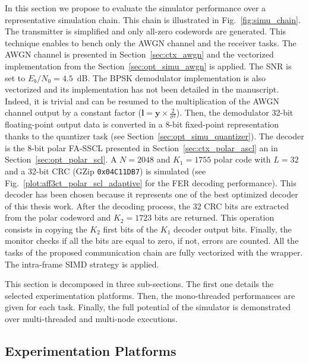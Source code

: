 In this section we propose to evaluate the simulator performance over a
representative simulation chain. This chain is illustrated in
Fig.~\ref{fig:simu_chain}. The transmitter is simplified and only all-zero
codewords are generated. This technique enables to bench only the AWGN channel
and the receiver tasks. The AWGN channel is presented in
Section~\ref{sec:ctx_awgn} and the vectorized implementation from the
Section~\ref{sec:opt_simu_awgn} is applied. The SNR is set to
$E_b/N_0 = 4.5$~dB. The BPSK demodulator implementation is also vectorized and
its implementation has not been detailed in the manuscript. Indeed, it is
trivial and can be resumed to the multiplication of the AWGN channel output by a
constant factor ($\bm{l} = \bm{y} \times \frac{2}{\sigma^2}$). Then, the
demodulator 32-bit floating-point output data is converted in a 8-bit
fixed-point representation thanks to the quantizer task (see
Section~\ref{sec:opt_simu_quantizer}). The decoder is the 8-bit polar FA-SSCL
presented in Section~\ref{sec:ctx_polar_ascl} an in
Section~\ref{sec:opt_polar_scl}. A $N = 2048$ and $K_1 = 1755$ polar code with
$L = 32$ and a 32-bit CRC (GZip \verb|0x04C11DB7|) is simulated (see
Fig.~\ref{plot:aff3ct_polar_scl_adaptive} for the FER decoding performance).
This decoder has been chosen because it represents one of the best optimized
decoder of this thesis work. After the decoding process, the 32 CRC bits are
extracted from the polar codeword and $K_2 = 1723$ bits are returned. This
operation consists in copying the $K_2$ first bits of the $K_1$ decoder output
bits. Finally, the monitor checks if all the bits are equal to zero, if not,
errors are counted. All the tasks of the proposed communication chain are fully
vectorized with the \MIPP wrapper. The intra-frame SIMD strategy is applied.

This section is decomposed in three sub-sections. The first one details the
selected experimentation platforms. Then, the mono-threaded performances
are given for each task. Finally, the full potential of the simulator is
demonstrated over multi-threaded and multi-node executions.

\subsection{Experimentation Platforms}

